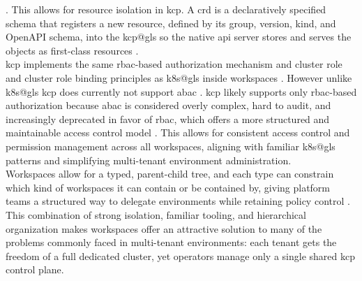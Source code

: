 \documentclass[11pt, a4paper, oneside, listof=totoc]{scrartcl}
\begin{document}
                \parencite{etcdPrefix}.
                This allows for resource isolation in \gls{kcp}.\@
                A \gls{crd} is a declaratively specified schema that registers a new  resource,
                defined by its group, version, kind, and OpenAPI schema, into the \gls{kcp@gls} so
                the native \gls{api} server stores and serves the objects as first-class
                resources \parencite{kubernetesCRD}.
                \\
                \gls{kcp} implements the same \gls{rbac}-based authorization mechanism and cluster
                role and cluster role binding principles as \gls{k8s@gls} inside workspaces 
                \parencite{kcpAuthorization}.
                However unlike \gls{k8s@gls} \gls{kcp} does currently not support \gls{abac}
                \parencites{kcpAuthorization}{kubernetesABAC}.
                \gls{kcp} likely supports only \gls{rbac}-based authorization because \gls{abac} is
                considered overly complex, hard to audit, and increasingly deprecated in favor of
                \gls{rbac}, which offers a more structured and maintainable access control model
                \parencite{kubernetesRBACBlog}.
                This allows for consistent access control and permission management across all
                workspaces, aligning with familiar \gls{k8s@gls} patterns and simplifying
                multi-tenant environment administration.
                \\
                Workspaces allow for a typed, parent-child tree, and each type can constrain which
                kind of workspaces it can contain or be contained by, giving platform teams a
                structured way to delegate environments while retaining policy control
                \parencite{kcpWorkspaces}.
                \\
                This combination of strong isolation, familiar tooling, and hierarchical
                organization makes workspaces offer an attractive solution to many of the problems
                commonly faced in multi-tenant environments: each tenant gets the freedom of a full
                dedicated cluster, yet operators manage only a single shared \gls{kcp} control
                plane.
            
\end{document}

